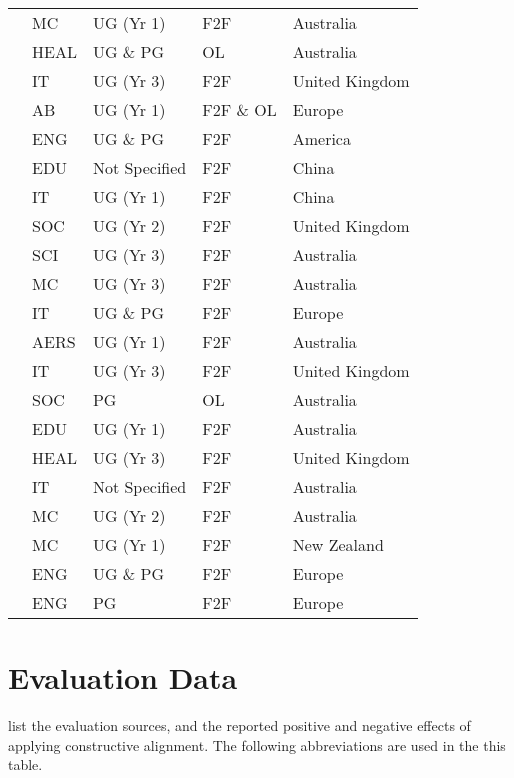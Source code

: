 \begin{center}
\begin{longtable}{|l|l|l|l|l|}
\citet{Kuhn:2009}	&	MC	&	UG (Yr 1)	&	F2F	&	Australia	\\
\citet{raeburn2009blended}	&	HEAL	&	UG \& PG	&	OL	&	Australia	\\
\citet{Hill:2009}	&	IT	&	UG (Yr 3)	&	F2F	&	United Kingdom	\\
\citet{scott2009promoting}	&	AB	&	UG (Yr 1)	&	F2F \& OL	&	Europe	\\
\citet{Schaefer:2009}	&	ENG	&	UG \& PG	&	F2F	&	America	\\
\citet{Qiao:2009}	&	EDU	&	Not Specified	&	F2F	&	China	\\
\citet{Thota:2010}	&	IT	&	UG (Yr 1)	&	F2F	&	China	\\
\citet{Teater:2010}	&	SOC	&	UG (Yr 2)	&	F2F	&	United Kingdom	\\
\citet{hartfield2010reinforcing}	&	SCI	&	UG (Yr 3)	&	F2F	&	Australia	\\
\citet{rossextending}	&	MC	&	UG (Yr 3)	&	F2F	&	Australia	\\
\citet{Shoufan:2010:CRP:1789934.1789937}	&	IT	&	UG \& PG	&	F2F	&	Europe	\\
\citet{Szili:2011}	&	AERS	&	UG (Yr 1)	&	F2F	&	Australia	\\
\citet{andrews2011aligning}	&	IT	&	UG (Yr 3)	&	F2F	&	United Kingdom	\\
\citet{terrell2011using}	&	SOC	&	PG	&	OL	&	Australia	\\
\citet{donnisonre}	&	EDU	&	UG (Yr 1)	&	F2F	&	Australia	\\
\citet{Joseph201252}	&	HEAL	&	UG (Yr 3)	&	F2F	&	United Kingdom	\\
\citet{Pardede:2012}	&	IT	&	Not Specified	&	F2F	&	Australia	\\
\citet{Kenney:2012}	&	MC	&	UG (Yr 2)	&	F2F	&	Australia	\\
\citet{hedgesconstructive}	&	MC	&	UG (Yr 1)	&	F2F	&	New Zealand	\\
\citet{Vanfretti:2011}	&	ENG	&	UG \& PG	&	F2F	&	Europe	\\
\citet{Marlies:2012}	&	ENG	&	PG	&	F2F	&	Europe	\\
\end{longtable}
\end{center}

\clearpage
\section{Evaluation Data} %
\label{sec:evaluation_data}

 list the evaluation sources, and the reported positive and negative effects of applying constructive alignment. The following abbreviations are used in the this table.

